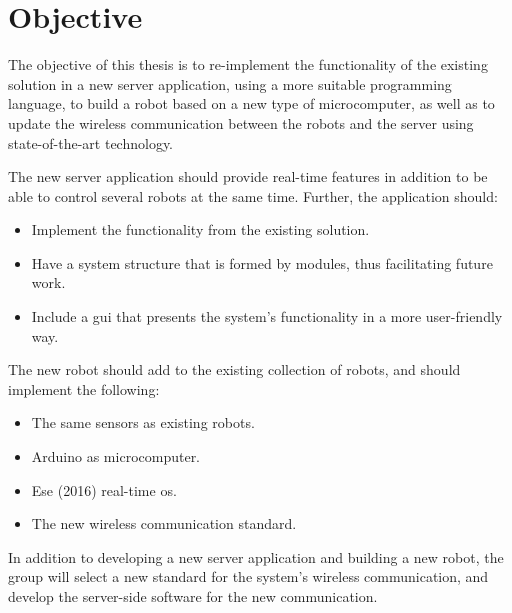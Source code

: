 \section{Objective}
The objective of this thesis is to re-implement the functionality of the existing solution in a new server application, using a more suitable programming language, to build a robot based on a new type of microcomputer, as well as to update the wireless communication between the robots and the server using state-of-the-art technology. 

The new server application should provide real-time features in addition to be able to control several robots at the same time. Further, the application should:
\begin{itemize}
    \item Implement the functionality from the existing solution.
    \item Have a system structure that is formed by modules, thus facilitating future work.
    \item Include a \acrlong{gui} that presents the system's functionality in a more user-friendly way.
\end{itemize}

The new robot should add to the existing collection of robots, and should implement the following:
\begin{itemize}
    \item The same sensors as existing robots.
    \item Arduino as microcomputer.
    \item Ese (2016) real-time \acrfull{os}.
    \item The new wireless communication standard.
\end{itemize}

In addition to developing a new server application and building a new robot, the group will select a new standard for the system's wireless communication, and develop the server-side software for the new communication.